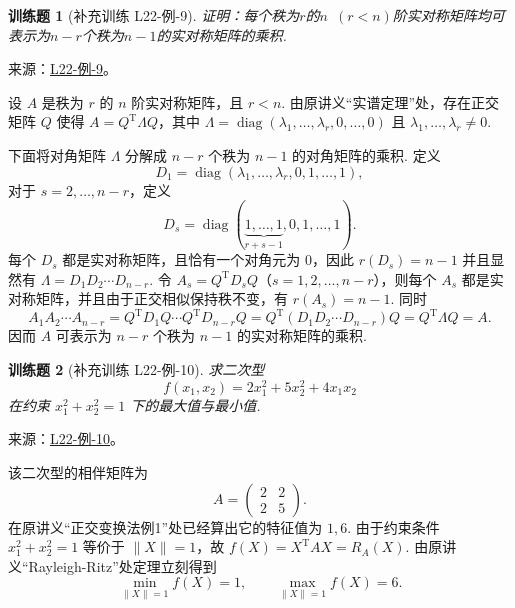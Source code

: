 \documentclass[12pt,fontset=fandol]{ctexart}
\newtheorem{exercise}{训练题}[section]
\begin{document}
\begin{exercise}[补充训练 L22-例-9]\label{prob:L22-例-9}
证明：每个秩为$r$的$n\enspace(r<n)$阶实对称矩阵均可表示为$n-r$个秩为$n-1$的实对称矩阵的乘积.
\end{exercise}
\noindent 来源：\href{https://github.com/yhwu-is/Linear-Algebra-Left-Undone/blob/new/%E8%AE%B2%E4%B9%89/%E4%B8%93%E9%A2%98/22%20%E4%BA%8C%E6%AC%A1%E5%9E%8B.tex}{L22-例-9}。
\begin{solve}
设 $A$ 是秩为 $r$ 的 $n$ 阶实对称矩阵，且 $r<n$. 由原讲义“实谱定理”处，存在正交矩阵 $Q$ 使得 $A=Q^\mathrm{T}\Lambda Q$，其中 $\Lambda=\operatorname{diag}(\lambda_1,\ldots,\lambda_r,0,\ldots,0)$ 且 $\lambda_1,\ldots,\lambda_r\neq 0$.

    下面将对角矩阵 $\Lambda$ 分解成 $n-r$ 个秩为 $n-1$ 的对角矩阵的乘积. 定义
    \[
        D_1=\operatorname{diag}(\lambda_1,\ldots,\lambda_r,0,1,\ldots,1),
    \]
    对于 $s=2,\ldots,n-r$，定义
    \[
        D_s=\operatorname{diag}(\underbrace{1,\ldots,1}_{r+s-1},0,1,\ldots,1).
    \]
    每个 $D_s$ 都是实对称矩阵，且恰有一个对角元为 $0$，因此 $r(D_s)=n-1$ 并且显然有 $\Lambda=D_1D_2\cdots D_{n-r}$. 令 $A_s=Q^\mathrm{T}D_sQ$（$s=1,2,\ldots,n-r$），则每个 $A_s$ 都是实对称矩阵，并且由于正交相似保持秩不变，有 $r(A_s)=n-1$. 同时
    \[
        A_1A_2\cdots A_{n-r}
        =Q^\mathrm{T}D_1Q\cdots Q^\mathrm{T}D_{n-r}Q
        =Q^\mathrm{T}(D_1D_2\cdots D_{n-r})Q
        =Q^\mathrm{T}\Lambda Q
        =A.
    \]
    因而 $A$ 可表示为 $n-r$ 个秩为 $n-1$ 的实对称矩阵的乘积.
\end{solve}

\begin{exercise}[补充训练 L22-例-10]\label{prob:L22-例-10}
求二次型
    \[
        f(x_1,x_2)=2x_1^2+5x_2^2+4x_1x_2
    \]
    在约束 $x_1^2+x_2^2=1$ 下的最大值与最小值.
\end{exercise}
\noindent 来源：\href{https://github.com/yhwu-is/Linear-Algebra-Left-Undone/blob/new/%E8%AE%B2%E4%B9%89/%E4%B8%93%E9%A2%98/22%20%E4%BA%8C%E6%AC%A1%E5%9E%8B.tex}{L22-例-10}。
\begin{solve}
该二次型的相伴矩阵为
    \[
        A=\begin{pmatrix}
            2 & 2 \\
            2 & 5
        \end{pmatrix}.
    \]
    在原讲义“正交变换法例1”处已经算出它的特征值为 $1,6$. 由于约束条件 $x_1^2+x_2^2=1$ 等价于 $\|X\|=1$，故 $f(X)=X^\mathrm{T}AX=R_A(X)$. 由原讲义“Rayleigh-Ritz”处定理立刻得到
    \[
        \min_{\|X\|=1}f(X)=1,\qquad \max_{\|X\|=1}f(X)=6.
    \]
\end{solve}
\end{document}
